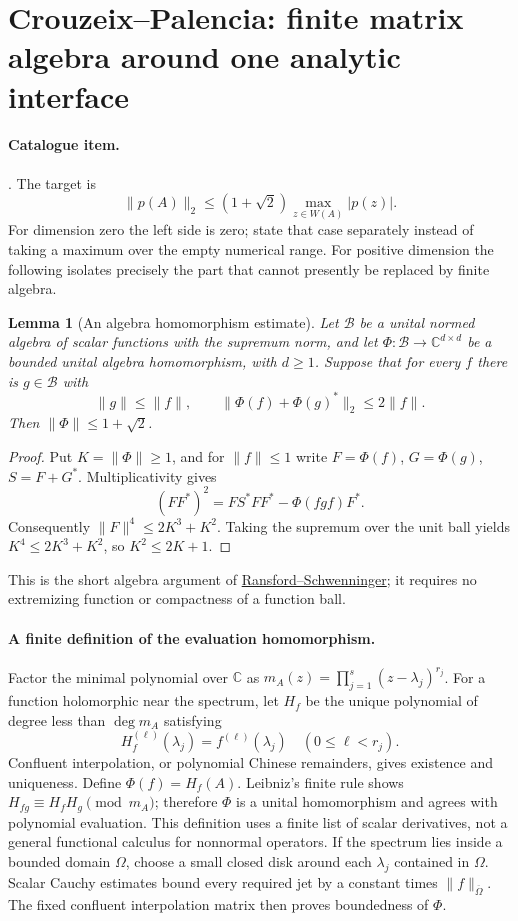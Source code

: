\documentclass[11pt,a4paper]{article}
\newtheorem{lemma}[theorem]{Lemma}
\theoremstyle{definition}
\newcommand{\C}{\mathbb C}
\newcommand{\code}[1]{\ifmmode\text{\small\nolinkurl{#1}}\else{\small\nolinkurl{#1}}\fi}
\begin{document}
\section{Crouzeix--Palencia: finite matrix algebra around one analytic interface}
\label{math:cp}
\paragraph{Catalogue item.} \code{crouzeix-palencia}.
The target is
\[
 \|p(A)\|_2\le(1+\sqrt2)\max_{z\in W(A)}|p(z)|.
\]
For dimension zero the left side is zero; state that case separately
instead of taking a maximum over the empty numerical range.
For positive dimension the following isolates precisely the part that
cannot presently be replaced by finite algebra.

\begin{lemma}[An algebra homomorphism estimate]
Let $\mathcal B$ be a unital normed algebra of scalar functions with
the supremum norm, and let $\Phi:\mathcal B\to\C^{d\times d}$ be a
bounded unital algebra homomorphism, with $d\ge1$. Suppose that for every $f$ there
is $g\in\mathcal B$ with
\[
 \|g\|\le\|f\|,\qquad
 \|\Phi(f)+\Phi(g)^*\|_2\le2\|f\|.
                                                        \tag{CP1}
\]
Then $\|\Phi\|\le1+\sqrt2$.
\end{lemma}
\begin{proof}
Put $K=\|\Phi\|\ge1$, and for $\|f\|\le1$ write
$F=\Phi(f)$, $G=\Phi(g)$, $S=F+G^*$. Multiplicativity gives
\[
 (FF^*)^2=FS^*FF^*-\Phi(fgf)F^*.
\]
Consequently $\|F\|^4\le2K^3+K^2$. Taking the supremum over the
unit ball yields $K^4\le2K^3+K^2$, so $K^2\le2K+1$.
\end{proof}
This is the short algebra argument of
\href{https://arxiv.org/abs/1708.08633}{Ransford--Schwenninger};
it requires no extremizing function or compactness of a function ball.

\paragraph{A finite definition of the evaluation homomorphism.}
Factor the minimal polynomial over $\C$ as
$m_A(z)=\prod_{j=1}^s(z-\lambda_j)^{r_j}$.
For a function holomorphic near the spectrum, let $H_f$ be the unique
polynomial of degree less than $\deg m_A$ satisfying
\[
 H_f^{(\ell)}(\lambda_j)=f^{(\ell)}(\lambda_j)
 \quad(0\le\ell<r_j).
\]
Confluent interpolation, or polynomial Chinese remainders, gives
existence and uniqueness. Define $\Phi(f)=H_f(A)$.
Leibniz's finite rule shows $H_{fg}\equiv H_fH_g\pmod {m_A}$;
therefore $\Phi$ is a unital homomorphism and agrees with polynomial
evaluation. This definition uses a finite list of scalar derivatives,
not a general functional calculus for nonnormal operators.
If the spectrum lies inside a bounded domain $\Omega$, choose a small
closed disk around each $\lambda_j$ contained in $\Omega$.
Scalar Cauchy estimates bound every required jet by a constant times
$\|f\|_{\overline\Omega}$. The fixed confluent interpolation matrix
then proves boundedness of $\Phi$.
\end{document}
